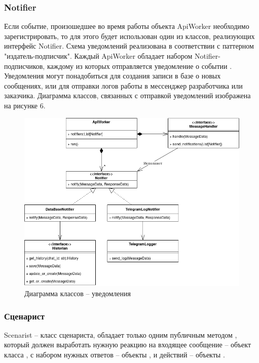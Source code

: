     \subsubsection{Notifier}
    Если событие, произошедшее во время работы объекта ApiWorker необходимо
    зарегистрировать, то для этого будет использован один из классов,
    реализующих интерфейс Notifier.
    Схема уведомлений реализована в соответствии с паттерном "издатель-подписчик".
    Каждый ApiWorker обладает набором Notifier-подписчиков, каждому из которых
    отправляется уведомление о событии .
    Уведомления могут понадобиться для создания записи в базе о новых сообщениях,
    или для отправки логов работы в мессенджер разработчика или заказчика.
    Диаграмма классов, связанных с отправкой уведомлений изображена на рисунке 6.
    \begin{figure}[H]
        \centering
        \includegraphics[width=0.9\linewidth]{static/ClassDiagram_notifiers.png}
        \caption{Диаграмма классов -- уведомления}
        \label{fig:class-diagram-notifiers}
    \end{figure}


    \newpage
    \subsubsection{Сценарист}
    Scenarist -- класс сценариста, обладает только одним публичным методом
    , который должен
    выработать нужную реакцию на входящее сообщение -- объект класса 
    ,
    с набором нужных ответов -- объекты ,
    и действий -- объекты .

